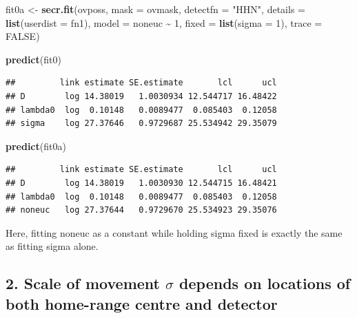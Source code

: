 \documentclass[
]{book}
\newenvironment{Shaded}{\begin{snugshade}}{\end{snugshade}}
\newcommand{\AttributeTok}[1]{\textcolor[rgb]{0.13,0.29,0.53}{#1}}
\newcommand{\ConstantTok}[1]{\textcolor[rgb]{0.56,0.35,0.01}{#1}}
\newcommand{\DecValTok}[1]{\textcolor[rgb]{0.00,0.00,0.81}{#1}}
\newcommand{\FunctionTok}[1]{\textcolor[rgb]{0.13,0.29,0.53}{\textbf{#1}}}
\newcommand{\NormalTok}[1]{#1}
\newcommand{\OtherTok}[1]{\textcolor[rgb]{0.56,0.35,0.01}{#1}}
\newcommand{\SpecialCharTok}[1]{\textcolor[rgb]{0.81,0.36,0.00}{\textbf{#1}}}
\newcommand{\StringTok}[1]{\textcolor[rgb]{0.31,0.60,0.02}{#1}}
\begin{document}
\begin{Shaded}
\begin{Highlighting}[]
\NormalTok{fit0a }\OtherTok{\textless{}{-}} \FunctionTok{secr.fit}\NormalTok{(ovposs, }\AttributeTok{mask =}\NormalTok{ ovmask, }\AttributeTok{detectfn =} \StringTok{"HHN"}\NormalTok{, }
    \AttributeTok{details =} \FunctionTok{list}\NormalTok{(}\AttributeTok{userdist =}\NormalTok{ fn1), }\AttributeTok{model =}\NormalTok{ noneuc }\SpecialCharTok{\textasciitilde{}} \DecValTok{1}\NormalTok{, }
    \AttributeTok{fixed =} \FunctionTok{list}\NormalTok{(}\AttributeTok{sigma =} \DecValTok{1}\NormalTok{), }\AttributeTok{trace =} \ConstantTok{FALSE}\NormalTok{)}
\end{Highlighting}
\end{Shaded}

\begin{Shaded}
\begin{Highlighting}[]
\FunctionTok{predict}\NormalTok{(fit0)}
\end{Highlighting}
\end{Shaded}

\begin{verbatim}
##         link estimate SE.estimate       lcl      ucl
## D        log 14.38019   1.0030934 12.544717 16.48422
## lambda0  log  0.10148   0.0089477  0.085403  0.12058
## sigma    log 27.37646   0.9729687 25.534942 29.35079
\end{verbatim}

\begin{Shaded}
\begin{Highlighting}[]
\FunctionTok{predict}\NormalTok{(fit0a)}
\end{Highlighting}
\end{Shaded}

\begin{verbatim}
##         link estimate SE.estimate       lcl      ucl
## D        log 14.38019   1.0030930 12.544715 16.48421
## lambda0  log  0.10148   0.0089477  0.085403  0.12058
## noneuc   log 27.37644   0.9729670 25.534923 29.35076
\end{verbatim}

Here, fitting noneuc as a constant while holding sigma fixed is exactly the same as fitting sigma alone.

\subsection{\texorpdfstring{2. Scale of movement \(\sigma\) depends on locations of both home-range centre and detector}{2. Scale of movement \textbackslash sigma depends on locations of both home-range centre and detector}}\label{scale-of-movement-sigma-depends-on-locations-of-both-home-range-centre-and-detector}
\end{document}
